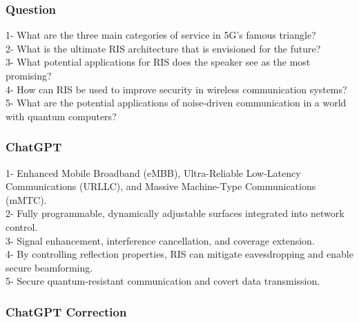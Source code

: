 \subsubsection{Question}
\begin{tcolorbox}[breakable]
    1- What are the three main categories of service in 5G's famous triangle?\\
2- What is the ultimate RIS architecture that is envisioned for the future?\\
3- What potential applications for RIS does the speaker see as the most promising?\\
4- How can RIS be used to improve security in wireless communication systems?\\
5- What are the potential applications of noise-driven communication in a world with quantum computers?\\

\end{tcolorbox}
\subsubsection{ChatGPT}
\begin{tcolorbox}[breakable]
    1- Enhanced Mobile Broadband (eMBB), Ultra-Reliable Low-Latency Communications (URLLC), and Massive Machine-Type Communications (mMTC).\\
2- Fully programmable, dynamically adjustable surfaces integrated into network control.\\
3- Signal enhancement, interference cancellation, and coverage extension.\\
4- By controlling reflection properties, RIS can mitigate eavesdropping and enable secure beamforming.\\
5- Secure quantum-resistant communication and covert data transmission.\\

\end{tcolorbox}
\subsubsection{ChatGPT Correction}
\begin{tcolorbox}[breakable]
    
\end{tcolorbox}
